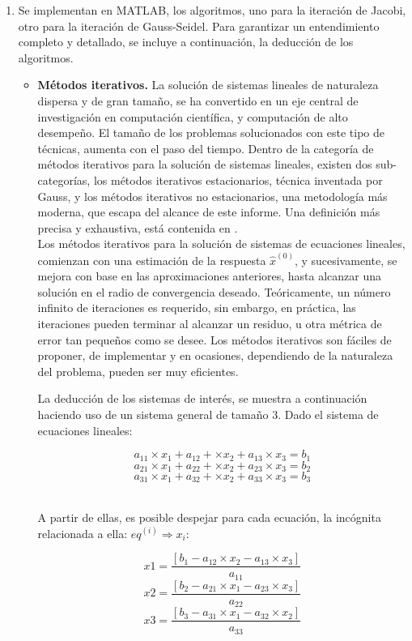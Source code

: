\documentclass[11pt, spanish]{article}
\begin{document}
\begin{enumerate}
\item Se implementan en \textsc{MATLAB}, los algoritmos, uno para la iteración de Jacobi, otro para la iteración de Gauss-Seidel. Para garantizar un entendimiento completo y detallado, se incluye a continuación,  la deducción de los algoritmos. 

\begin{itemize}
\item \textbf{Métodos iterativos.} La solución de sistemas lineales de naturaleza dispersa y de gran tamaño, se ha convertido en un eje central de investigación en computación científica, y computación de alto desempeño. El tamaño de los problemas solucionados con este tipo de técnicas, aumenta con el paso del tiempo. Dentro de la categoría de métodos iterativos para la solución de sistemas lineales, existen dos sub-categorías, los métodos iterativos estacionarios, técnica inventada por Gauss, y los métodos iterativos no estacionarios, una metodología más moderna, que escapa del alcance de este informe. Una definición más precisa y exhaustiva, está contenida en \cite{heath2005scientific}. \\

Los métodos iterativos para la solución de sistemas de ecuaciones lineales, comienzan con una estimación de la respuesta $\hat{x}^{(0)}$, y sucesivamente, se mejora con base en las aproximaciones anteriores, hasta alcanzar una solución en el radio de convergencia deseado. Teóricamente, un número infinito de iteraciones es requerido, sin embargo, en práctica, las iteraciones pueden terminar al alcanzar un residuo, u otra métrica de error tan pequeños como se desee. Los métodos iterativos son fáciles de proponer, de implementar y en ocasiones, dependiendo de la naturaleza del problema, pueden ser muy eficientes.

\newpage

La deducción de los sistemas de interés, se muestra a continuación haciendo uso de un sistema general de tamaño 3. Dado el sistema de ecuaciones lineales:

$$ a_{11} \times x_1 + a_{12} + \times x_2+ a_{13} \times x_3 = b_1 $$
$$ a_{21} \times x_1 + a_{22} + \times x_2+ a_{23} \times x_3 = b_2 $$
$$ a_{31} \times x_1 + a_{32} + \times x_2+ a_{33} \times x_3 = b_3 $$\

A partir de ellas, es posible despejar para cada ecuación, la incógnita relacionada a ella: $eq^{(i)} \Rightarrow x_i$:

$$ x1 = \frac{\left[ b_1 - a_{12} \times x_2 - a_{13} \times x_3\right]}{a_{11}} $$
$$ x2 = \frac{\left[ b_2 - a_{21} \times x_1 - a_{23} \times x_3\right]}{a_{22}} $$
$$ x3 = \frac{\left[ b_3 - a_{31} \times x_1 - a_{32} \times x_2\right]}{a_{33}} $$\


\end{itemize}
\end{enumerate}
\end{document}
